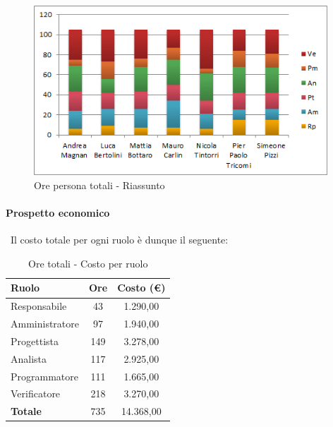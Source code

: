 \documentclass[./PianoDiProgetto.tex]{subfiles}
\begin{document}
	\begin{figure}[H]
		\centering
		\includegraphics[width=11cm, trim=1cm 0cm 1cm 0cm]{grafici/TOT-persona}
			\caption{Ore persona totali - Riassunto}
	\end{figure}

\newpage

	\paragraph{Prospetto economico}\
					Il costo totale per ogni ruolo è dunque il seguente:
	\begin{table}[H]
		\centering
		\begin{tabular}{l * {2}{c}}
			\toprule
			\textbf{Ruolo} & \textbf{Ore} & \textbf{Costo (\euro{})} \\
			\midrule
			Responsabile & 43    &  1.290,00 \\
			Amministratore  & 97   &  1.940,00 \\
			Progettista  & 149   &  3.278,00 \\
			Analista & 117   &  2.925,00 \\
			Programmatore  & 111   &  1.665,00 \\
			Verificatore  & 218   &  3.270,00 \\
			\midrule
			\textbf{Totale}  & 735  &  14.368,00 \\
			\bottomrule

		\end{tabular}
		\caption{Ore totali - Costo per ruolo}
	\end{table}

\vspace{35 mm}
\end{document}
